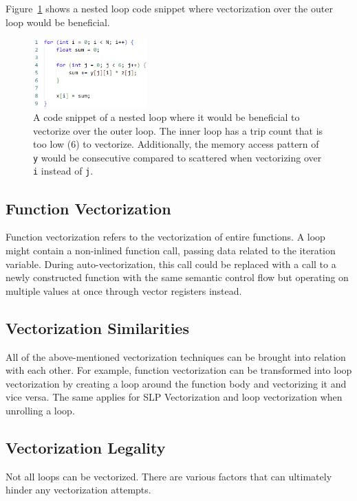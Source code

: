 \documentclass[sigplan,11pt,nonacm]{acmart}
\begin{document}
Figure~\ref{fig:outer-loop-vec} shows a nested loop code snippet where vectorization over the
outer loop would be beneficial.

\begin{figure}
  \centering
  \includegraphics[width=0.39\textwidth]{images/outer-loop-vec.png}
  \caption{A code snippet of a nested loop where it would be beneficial to vectorize over the 
  outer loop. The inner loop has a trip count that is too low (6) to vectorize. Additionally,
  the memory access pattern of \texttt{y} would be consecutive compared to scattered when
  vectorizing over \texttt{i} instead of \texttt{j}.}
  \label{fig:outer-loop-vec}
\end{figure}

\subsection{Function Vectorization}
Function vectorization refers to the vectorization of entire functions. A loop might contain a
non-inlined function call, passing data related to the iteration variable. During auto-vectorization, 
this call could be replaced with a call to a newly constructed function with the same semantic 
control flow but operating on multiple values at once through vector registers instead.

\subsection{Vectorization Similarities}
All of the above-mentioned vectorization techniques can be brought into relation with each other. 
For example, function vectorization can be transformed into loop vectorization by creating a loop 
around the function body and vectorizing it and vice versa. The same applies for SLP Vectorization 
and loop vectorization when unrolling a loop.
 
\subsection{Vectorization Legality}
Not all loops can be vectorized. There are various factors that can ultimately hinder any
vectorization attempts.
\end{document}

